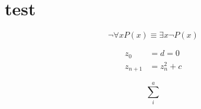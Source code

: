 \section{test}

\begin{displaymath}
\neg \forall x P(x) \equiv \exists x \neg P(x)
\end{displaymath}

\begin{align}
z_0 &= d = 0 \\
z_{n+1} &= z_n^2+c
\end{align}

\begin{displaymath}
    \sum_{i}^{a}
\end{displaymath}
